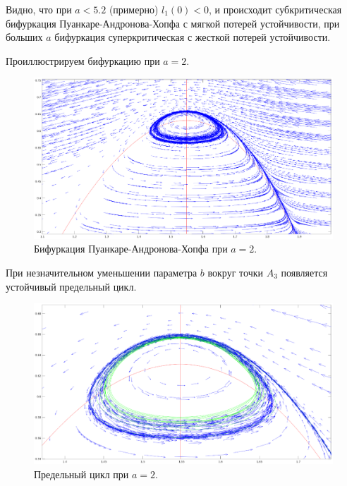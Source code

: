 \documentclass[16pt]{article}
\begin{document}
Видно, что при $a < 5.2$ (примерно) $l_1(0) < 0$, и происходит субкритическая
бифуркация Пуанкаре-Андронова-Хопфа с мягкой потерей устойчивости, при больших $a$ бифуркация суперкритическая 
с жесткой потерей устойчивости.

\newpage

Проиллюстрируем бифуркацию при $a = 2$.

\begin{figure}[h]
\begin{center}
\includegraphics[width=140mm]{bif.eps}
\caption{Бифуркация Пуанкаре-Андронова-Хопфа при $a = 2$.}
\end{center}
\end{figure}

При незначительном уменьшении параметра $b$ вокруг точки $A_3$ появляется устойчивый предельный цикл.

\begin{figure}[h]
\begin{center}
\includegraphics[width=140mm]{cycle.eps}
\caption{Предельный цикл при $a = 2$.}
\end{center}
\end{figure}
\end{document}
